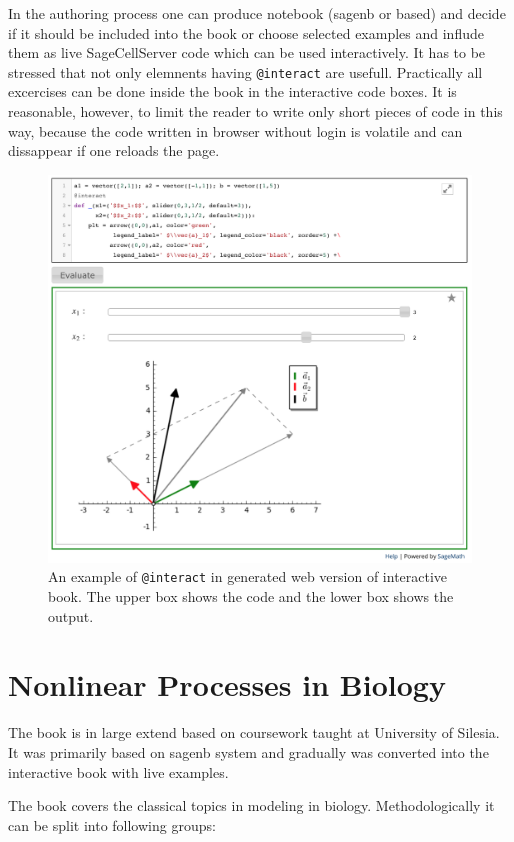 \documentclass{deliverablereport}
\begin{document}
In the authoring process one can produce notebook (sagenb or \Jupyter
based) and decide if it should be included into the \Sphinx book or
choose selected examples and influde them as live SageCellServer code
which can be used interactively. It has to be stressed that not only
elemnents having \texttt{@interact} are usefull. Practically all
excercises can be done inside the book in the interactive code
boxes. It is reasonable, however, to limit the reader to write only
short pieces of code in this way, because the code written in browser
without login is volatile and can dissappear if one reloads the page.

\begin{figure}
\centerline{\includegraphics[width=.7\textwidth]{interact_in_sphinx.png}}
\caption{\label{fig:interact_sphinx} An example of \texttt{@interact} in
  \Sphinx generated web version of interactive book. The upper box
  shows the code and the lower box shows the output.}
\end{figure}


\section{ Nonlinear Processes in Biology }


The book is in large extend based on coursework taught at University
of Silesia. It was primarily based on sagenb system and gradually was
converted into the interactive book with live examples.


The book covers the classical topics in modeling in
biology. Methodologically it can be split into following groups:
\end{document}
